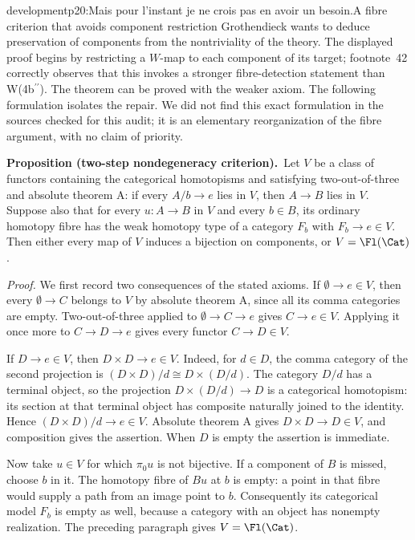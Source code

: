 \begin{dcomment}{development}{p20:Mais pour l'instant je ne crois pas en avoir un besoin.}{A fibre criterion that avoids component restriction}
Grothendieck wants to deduce preservation of components from the nontriviality of the theory. The displayed proof begins by restricting a \(W\)-map to each component of its target; footnote~42 correctly observes that this invokes a stronger fibre-detection statement than W(4b\(^{\prime\prime}\)). The theorem can be proved with the weaker axiom. The following formulation isolates the repair. We did not find this exact formulation in the sources checked for this audit; it is an elementary reorganization of the fibre argument, with no claim of priority.

\textbf{Proposition (two-step nondegeneracy criterion).}\ours\
Let \(V\) be a class of functors containing the categorical homotopisms and satisfying two-out-of-three and absolute theorem A: if every \(A/b\to e\) lies in \(V\), then \(A\to B\) lies in \(V\). Suppose also that for every \(u:A\to B\) in \(V\) and every \(b\in B\), its ordinary homotopy fibre has the weak homotopy type of a category \(F_b\) with \(F_b\to e\in V\). Then either every map of \(V\) induces a bijection on components, or \(V=\Fl(\Cat)\).

\emph{Proof.}
We first record two consequences of the stated axioms. If \(\emptyset\to e\in V\), then every \(\emptyset\to C\) belongs to \(V\) by absolute theorem A, since all its comma categories are empty. Two-out-of-three applied to
\(\emptyset\to C\to e\) gives \(C\to e\in V\). Applying it once more to \(C\to D\to e\) gives every functor \(C\to D\in V\).

If \(D\to e\in V\), then \(D\times D\to e\in V\). Indeed, for \(d\in D\), the comma category of the second projection is
\((D\times D)/d\cong D\times(D/d)\).
The category \(D/d\) has a terminal object, so the projection \(D\times(D/d)\to D\) is a categorical homotopism: its section at that terminal object has composite naturally joined to the identity. Hence \((D\times D)/d\to e\in V\). Absolute theorem A gives \(D\times D\to D\in V\), and composition gives the assertion. When \(D\) is empty the assertion is immediate.

Now take \(u\in V\) for which \(\pi_0u\) is not bijective. If a component of \(B\) is missed, choose \(b\) in it. The homotopy fibre of \(Bu\) at \(b\) is empty: a point in that fibre would supply a path from an image point to \(b\). Consequently its categorical model \(F_b\) is empty as well, because a category with an object has nonempty realization. The preceding paragraph gives \(V=\Fl(\Cat)\).


\end{dcomment}
